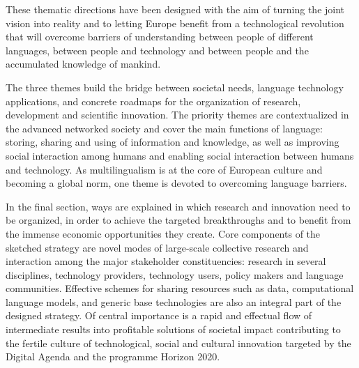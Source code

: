 \documentclass[10pt, plain]{../../metanetpaper}
\begin{document}
\begin{multicols}{2}
These thematic directions have been designed with the aim of turning the joint vision into reality and to letting Europe benefit from a technological revolution that will overcome barriers of understanding between people of different languages, between people and technology and between people and the accumulated knowledge of mankind.

The three themes build the bridge between societal needs, language technology applications, and concrete roadmaps for the organization of research, development and scientific innovation. The priority themes are contextualized in the advanced networked society and cover the main functions of language: storing, sharing and using of information and knowledge, as well as improving social interaction among humans and enabling social interaction between humans and technology. As multilingualism is at the core of European culture and becoming a global norm, one theme is devoted to overcoming language barriers.

In the final section, ways are explained in which research and innovation need to be organized, in order to achieve the targeted breakthroughs and to benefit from the immense economic opportunities they create. Core components of the sketched strategy are novel modes of large-scale collective research and interaction among the major stakeholder constituencies: research in several disciplines, technology providers, technology users, policy makers and language communities. Effective schemes for sharing resources such as data, computational language models, and generic base technologies are also an integral part of the designed strategy. Of central importance is a rapid and effectual flow of intermediate results into profitable solutions of societal impact contributing to the fertile culture of technological, social and cultural innovation targeted by the Digital Agenda and the programme Horizon 2020.
\end{multicols}

\clearpage

\end{document}
